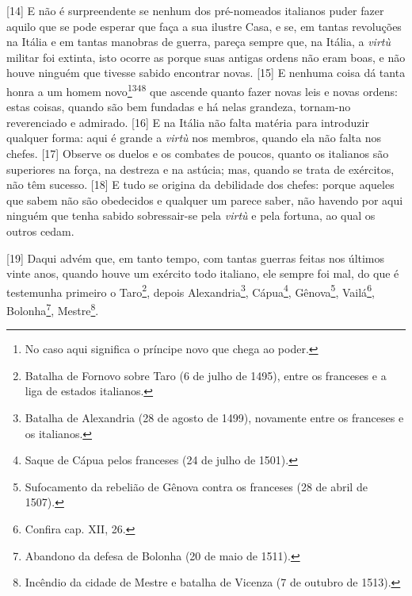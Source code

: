 {[}14{]} E não é surpreendente se nenhum dos pré-nomeados italianos
puder fazer aquilo que se pode esperar que faça a sua ilustre Casa, e
se, em tantas revoluções na Itália e em tantas manobras de guerra,
pareça sempre que, na Itália, a \emph{virtù} militar foi extinta, isto
ocorre as porque suas antigas ordens não eram boas, e não houve ninguém
que tivesse sabido encontrar novas. {[}15{]} E nenhuma coisa dá tanta
honra a um homem novo\footnote{No caso aqui significa o príncipe novo
  que chega ao poder.}\textsuperscript{348} que ascende quanto fazer
novas leis e novas ordens: estas coisas, quando são bem fundadas e há
nelas grandeza, tornam-no reverenciado e admirado. {[}16{]} E na Itália
não falta matéria para introduzir qualquer forma: aqui é grande a
\emph{virtù} nos membros, quando ela não falta nos chefes. {[}17{]}
Observe os duelos e os combates de poucos, quanto os italianos são
superiores na força, na destreza e na astúcia; mas, quando se trata de
exércitos, não têm sucesso. {[}18{]} E tudo se origina da debilidade dos
chefes: porque aqueles que sabem não são obedecidos e qualquer um parece
saber, não havendo por aqui ninguém que tenha sabido sobressair-se pela
\emph{virtù} e pela fortuna, ao qual os outros cedam.

{[}19{]} Daqui advém que, em tanto tempo, com tantas guerras feitas nos
últimos vinte anos, quando houve um exército todo italiano, ele sempre
foi mal, do que é testemunha primeiro o Taro\footnote{Batalha de Fornovo
  sobre Taro (6 de julho de 1495), entre os franceses e a liga de
  estados italianos.}, depois Alexandria\footnote{Batalha de Alexandria
  (28 de agosto de 1499), novamente entre os franceses e os italianos.},
Cápua\footnote{Saque de Cápua pelos franceses (24 de julho de 1501).},
Gênova\footnote{Sufocamento da rebelião de Gênova contra os franceses
  (28 de abril de 1507).}, Vailá\footnote{Confira cap. XII, 26.},
Bolonha\footnote{Abandono da defesa de Bolonha (20 de maio de 1511).},
Mestre\footnote{Incêndio da cidade de Mestre e batalha de Vicenza (7 de
  outubro de 1513).}.

